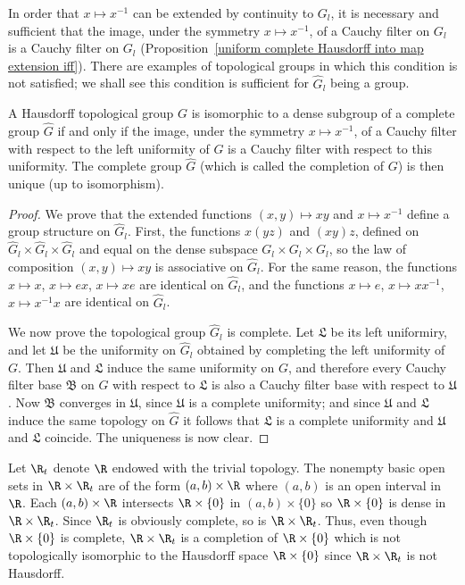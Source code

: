In order that $x\mapsto x^{-1}$ can be extended by continuity to $G_l$, it is necessary and sufficient that the image, under the symmetry $x\mapsto x^{-1}$, of a Cauchy filter on $G_l$ is a Cauchy filter on $G_l$ (Proposition~\ref{uniform complete Hausdorff into map extension iff}). There are examples of topological groups in which this condition is not satisfied; we shall see this condition is sufficient for $\widehat{G}_l$ being a group.
\begin{theorem}\label{topological group completion if}
A Hausdorff topological group $G$ is isomorphic to a dense subgroup of a complete group $\widehat{G}$ if and only if the image, under the symmetry $x\mapsto x^{-1}$, of a Cauchy filter with respect to the left uniformity of $G$ is a Cauchy filter with respect to this uniformity. The complete group $\widehat{G}$ (which is called the completion of $G$) is then unique (up to isomorphism).
\end{theorem}
\begin{proof}
We prove that the extended functions $(x,y)\mapsto xy$ and $x\mapsto x^{-1}$ define a group structure on $\widehat{G}_l$. First, the functions $x(yz)$ and $(xy)z$, defined on $\widehat{G}_l\times\widehat{G}_l\times\widehat{G}_l$ and equal on the dense subspace $G_l\times G_l\times G_l$, so the law of composition $(x,y)\mapsto xy$ is associative on $\widehat{G}_l$. For the same reason, the functions $x\mapsto x$, $x\mapsto ex$, $x\mapsto xe$ are identical on $\widehat{G}_l$, and the functions $x\mapsto e$, $x\mapsto xx^{-1}$, $x\mapsto x^{-1}x$ are identical on $\widehat{G}_l$.\par
We now prove the topological group $\widehat{G}_l$ is complete. Let $\mathfrak{L}$ be its left uniformiry, and let $\mathfrak{U}$ be the uniformity on $\widehat{G}_l$ obtained by completing the left uniformity of $G$. Then $\mathfrak{U}$ and $\mathfrak{L}$ induce the same uniformity on $G$, and therefore every Cauchy filter base $\mathfrak{B}$ on $G$ with respect to $\mathfrak{L}$ is also a Cauchy filter base with respect to $\mathfrak{U}$. Now $\mathfrak{B}$ converges in $\mathfrak{U}$, since $\mathfrak{U}$ is a complete uniformity; and since $\mathfrak{U}$ and $\mathfrak{L}$ induce the same topology on $\widehat{G}$ it follows that $\mathfrak{L}$ is a complete uniformity and $\mathfrak{U}$ and $\mathfrak{L}$ coincide. The uniqueness is now clear.
\end{proof}
\begin{example}
Let $\R_t$ denote $\R$ endowed with the trivial topology. The nonempty basic open sets in $\R\times\R_t$ are of the form $(a,b)\times\R$ where $(a,b)$ is an open interval in $\R$. Each $(a,b)\times\R$ intersects $\R\times\{0\}$ in $(a,b)\times\{0\}$ so $\R\times\{0\}$ is dense in $\R\times\R_t$. Since $\R_t$ is obviously complete, so is $\R\times\R_t$. Thus, even though $\R\times\{0\}$ is complete, $\R\times\R_t$ is a completion of $\R\times\{0\}$ which is not topologically isomorphic to the Hausdorff space $\R\times\{0\}$ since $\R\times\R_t$ is not Hausdorff.
\end{example}
